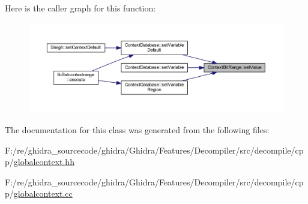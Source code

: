 Here is the caller graph for this function\+:
\nopagebreak
\begin{figure}[H]
\begin{center}
\leavevmode
\includegraphics[width=350pt]{class_context_bit_range_a9aa57773da860d022bd8b1b2e59d1790_icgraph}
\end{center}
\end{figure}


The documentation for this class was generated from the following files\+:\begin{DoxyCompactItemize}
\item 
F\+:/re/ghidra\+\_\+sourcecode/ghidra/\+Ghidra/\+Features/\+Decompiler/src/decompile/cpp/\mbox{\hyperlink{globalcontext_8hh}{globalcontext.\+hh}}\item 
F\+:/re/ghidra\+\_\+sourcecode/ghidra/\+Ghidra/\+Features/\+Decompiler/src/decompile/cpp/\mbox{\hyperlink{globalcontext_8cc}{globalcontext.\+cc}}\end{DoxyCompactItemize}
